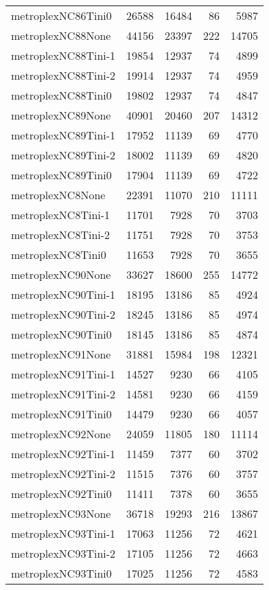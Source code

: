 \begin{longtable}{lrrrr}
metroplexNC86Tini0 & 26588 & 16484 & 86 & 5987 \\
metroplexNC88None & 44156 & 23397 & 222 & 14705 \\
metroplexNC88Tini-1 & 19854 & 12937 & 74 & 4899 \\
metroplexNC88Tini-2 & 19914 & 12937 & 74 & 4959 \\
metroplexNC88Tini0 & 19802 & 12937 & 74 & 4847 \\
metroplexNC89None & 40901 & 20460 & 207 & 14312 \\
metroplexNC89Tini-1 & 17952 & 11139 & 69 & 4770 \\
metroplexNC89Tini-2 & 18002 & 11139 & 69 & 4820 \\
metroplexNC89Tini0 & 17904 & 11139 & 69 & 4722 \\
metroplexNC8None & 22391 & 11070 & 210 & 11111 \\
metroplexNC8Tini-1 & 11701 & 7928 & 70 & 3703 \\
metroplexNC8Tini-2 & 11751 & 7928 & 70 & 3753 \\
metroplexNC8Tini0 & 11653 & 7928 & 70 & 3655 \\
metroplexNC90None & 33627 & 18600 & 255 & 14772 \\
metroplexNC90Tini-1 & 18195 & 13186 & 85 & 4924 \\
metroplexNC90Tini-2 & 18245 & 13186 & 85 & 4974 \\
metroplexNC90Tini0 & 18145 & 13186 & 85 & 4874 \\
metroplexNC91None & 31881 & 15984 & 198 & 12321 \\
metroplexNC91Tini-1 & 14527 & 9230 & 66 & 4105 \\
metroplexNC91Tini-2 & 14581 & 9230 & 66 & 4159 \\
metroplexNC91Tini0 & 14479 & 9230 & 66 & 4057 \\
metroplexNC92None & 24059 & 11805 & 180 & 11114 \\
metroplexNC92Tini-1 & 11459 & 7377 & 60 & 3702 \\
metroplexNC92Tini-2 & 11515 & 7376 & 60 & 3757 \\
metroplexNC92Tini0 & 11411 & 7378 & 60 & 3655 \\
metroplexNC93None & 36718 & 19293 & 216 & 13867 \\
metroplexNC93Tini-1 & 17063 & 11256 & 72 & 4621 \\
metroplexNC93Tini-2 & 17105 & 11256 & 72 & 4663 \\
metroplexNC93Tini0 & 17025 & 11256 & 72 & 4583 \\

\end{longtable}
